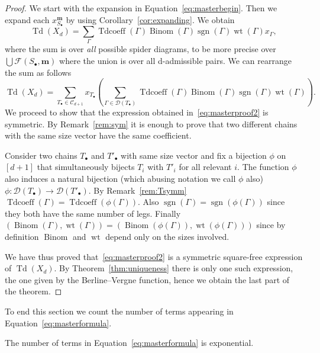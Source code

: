 \documentclass[ALCO,ThmDefs,Unicode,epreuves]{cedram}
\newcommand{\bm}[1]{{\boldsymbol{#1}}}
\newcommand\m{\bm{m}}
\DeclareMathOperator{\wt}{wt}
\DeclareMathOperator{\Bi}{Binom}
\DeclareMathOperator{\sgn}{sgn}
\DeclareMathOperator{\Tdcoeff}{Tdcoeff}
\DeclareMathOperator{\td}{Td}
\newcommand{\D}{{\Gamma}}
\newcommand{\spd}{\mathcal F}
\newcommand{\CC}{\mathcal{C}}
\begin{document}
\begin{proof}
	We start with the expansion in Equation~\eqref{eq:masterbegin}. Then we expand each $ x_{S_\bullet}^\m$ by using Corollary~\ref{cor:expanding}. We obtain
	\begin{equation}\label{eq:masterproof1}
	\td(X_d) = \sum_{\D}\Tdcoeff(\D)\Bi(\D)\sgn(\D)\wt(\D)x_\D,
	\end{equation}
	where the sum is over \emph{all} possible spider diagrams, to be more precise over $\bigcup\spd(S_\bullet,\m)$ where the union is over all d-admissible pairs. We can rearrange the sum as follows
	\begin{equation}\label{eq:masterproof2}
	\td(X_d) = \sum_{T_\bullet\in\CC_{d+1}}x_{T_\bullet}\left(\sum_{\D\in\mathcal{D}(T_\bullet)}\Tdcoeff(\D)\Bi(\D)\sgn(\D)\wt(\D)\right).
	\end{equation}
	We proceed to show that the expression obtained in~\eqref{eq:masterproof2} is symmetric. By Remark~\ref{rem:sym} it is enough to prove that two different chains with the same size vector have the same coefficient.
	
	Consider two chains $T_\bullet$ and $T'_\bullet$ with same size vector and fix a bijection $\phi$ on $[d+1]$ that simultaneously bijects $T_i$ with $T'_i$ for all relevant $i$. The function $\phi$ also induces a natural bijection (which abusing notation we call $\phi$ also) $\phi:\mathcal{D}(T_\bullet)\to\mathcal{D}(T'_\bullet)$. By Remark~\ref{rem:Tsymm} $\Tdcoeff(\D)=\Tdcoeff(\phi(\D))$. Also $\sgn(\D)=\sgn(\phi(\D))$ since they both have the same number of legs. Finally $(\Bi(\D),\wt(\D))=(\Bi(\phi(\D)),\wt(\phi(\D)))$ since by definition $\Bi$ and $\wt$ depend only on the sizes involved.
	
	We have thus proved that~\eqref{eq:masterproof2} is a symmetric square-free expression of $\td(X_d)$. By Theorem~\ref{thm:uniqueness} there is only one such expression, the one given by the Berline--Vergne function, hence we obtain the last part of the theorem.
\end{proof}

To end this section we count the number of terms appearing in Equation~\eqref{eq:masterformula}.

\begin{prop}
	The number of terms in Equation~\eqref{eq:masterformula} is exponential.
\end{prop}
\end{document}
